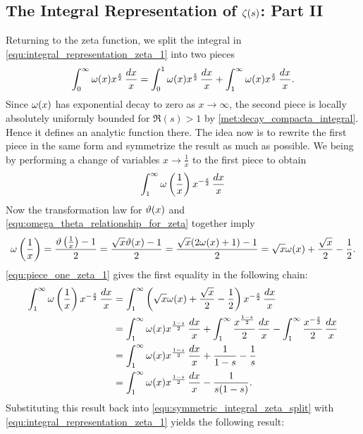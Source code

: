     \subsection*{The Integral Representation of \texorpdfstring{$\zeta(s)$}{\z(s)}: Part II}
      Returning to the zeta function, we split the integral in \cref{equ:integral_representation_zeta_1} into two pieces
      \begin{equation}\label{equ:symmetric_integral_zeta_split}
        \int_{0}^{\infty}\omega(x)x^{\frac{s}{2}}\,\frac{dx}{x} = \int_{0}^{1}\omega(x)x^{\frac{s}{2}}\,\frac{dx}{x}+\int_{1}^{\infty}\omega(x)x^{\frac{s}{2}}\,\frac{dx}{x}.
      \end{equation}
      Since $\omega(x)$ has exponential decay to zero as $x \to \infty$, the second piece is locally absolutely uniformly bounded for $\Re(s) > 1$ by \cref{met:decay_compacta_integral}. Hence it defines an analytic function there. The idea now is to rewrite the first piece in the same form and symmetrize the result as much as possible. We being by performing a change of variables $x \to \frac{1}{x}$ to the first piece to obtain
      \[
        \int_{1}^{\infty}\omega\left(\frac{1}{x}\right)x^{-\frac{s}{2}}\,\frac{dx}{x}
      \]
      Now the transformation law for $\vartheta(x)$ and \cref{equ:omega_theta_relationship_for_zeta} together imply
      \begin{equation}\label{equ:piece_one_zeta_1}
        \omega\left(\frac{1}{x}\right) = \frac{\vartheta\left(\frac{1}{x}\right)-1}{2} = \frac{\sqrt{x}\vartheta(x)-1}{2} = \frac{\sqrt{x}(2\omega(x)+1)-1}{2} = \sqrt{x}\omega(x)+\frac{\sqrt{x}}{2}-\frac{1}{2}.
      \end{equation}
      \cref{equ:piece_one_zeta_1} gives the first equality in the following chain:
      \begin{align*}
        \int_{1}^{\infty}\omega\left(\frac{1}{x}\right)x^{-\frac{s}{2}}\,\frac{dx}{x} &= \int_{1}^{\infty}\left(\sqrt{x}\omega(x)+\frac{\sqrt{x}}{2}-\frac{1}{2}\right)x^{-\frac{s}{2}}\,\frac{dx}{x} \\
        &= \int_{1}^{\infty}\omega(x)x^{\frac{1-s}{2}}\,\frac{dx}{x}+\int_{1}^{\infty}\frac{x^{\frac{1-s}{2}}}{2}\,\frac{dx}{x}-\int_{1}^{\infty}\frac{x^{-\frac{s}{2}}}{2}\,\frac{dx}{x} \\
        &= \int_{1}^{\infty}\omega(x)x^{\frac{1-s}{2}}\,\frac{dx}{x}+\frac{1}{1-s}-\frac{1}{s} \\
        &= \int_{1}^{\infty}\omega(x)x^{\frac{1-s}{2}}\,\frac{dx}{x}-\frac{1}{s(1-s)}.
      \end{align*}
      Substituting this result back into \cref{equ:symmetric_integral_zeta_split} with \cref{equ:integral_representation_zeta_1} yields the following result:

